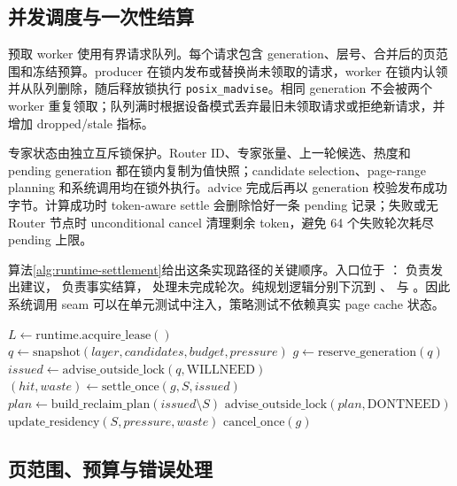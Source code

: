\subsection{并发调度与一次性结算}

预取 worker 使用有界请求队列。每个请求包含 generation、层号、合并后的页范围和冻结预算。producer 在锁内发布或替换尚未领取的请求，worker 在锁内认领并从队列删除，随后释放锁执行 \texttt{posix\_madvise}。相同 generation 不会被两个 worker 重复领取；队列满时根据设备模式丢弃最旧未领取请求或拒绝新请求，并增加 dropped/stale 指标。

专家状态由独立互斥锁保护。Router ID、专家张量、上一轮候选、热度和 pending generation 都在锁内复制为值快照；candidate selection、page-range planning 和系统调用均在锁外执行。advice 完成后再以 generation 校验发布成功字节。计算成功时 token-aware settle 会删除恰好一条 pending 记录；失败或无 Router 节点时 unconditional cancel 清理剩余 token，避免 64 个失败轮次耗尽 pending 上限。

算法\ref{alg:runtime-settlement}给出这条实现路径的关键顺序。入口位于 ： 负责发出建议， 负责事实结算， 处理未完成轮次。纯规划逻辑分别下沉到 、 与 。因此系统调用 seam 可以在单元测试中注入，策略测试不依赖真实 page cache 状态。

\begin{algorithm}[H]
  \caption{图执行期间的预取、结算与回收实现}
  \label{alg:runtime-settlement}
  \begin{algorithmic}[1]
    \STATE $L \gets \mathrm{runtime.acquire\_lease}()$
    \STATE $q \gets \mathrm{snapshot}(layer, candidates, budget, pressure)$ 
    \STATE $g \gets \mathrm{reserve\_generation}(q)$
    \STATE $issued \gets \mathrm{advise\_outside\_lock}(q,\mathrm{WILLNEED})$
      \STATE $(hit,waste) \gets \mathrm{settle\_once}(g,S,issued)$
      \STATE $plan \gets \mathrm{build\_reclaim\_plan}(issued\setminus S)$
      \STATE $\mathrm{advise\_outside\_lock}(plan,\mathrm{DONTNEED})$
      \STATE $\mathrm{update\_residency}(S,pressure,waste)$
    \ELSE
      \STATE $\mathrm{cancel\_once}(g)$
    \ENDIF
  \end{algorithmic}
\end{algorithm}

\subsection{页范围、预算与错误处理}

